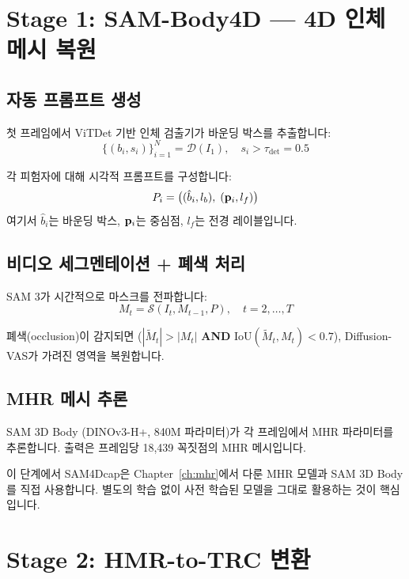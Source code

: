 \documentclass[11pt, a4paper]{report}
\begin{document}
\section{Stage 1: SAM-Body4D --- 4D 인체 메시 복원}

\subsection{자동 프롬프트 생성}

첫 프레임에서 ViTDet 기반 인체 검출기가 바운딩 박스를 추출합니다:
\begin{equation}
\{(b_i, s_i)\}_{i=1}^N = \mathcal{D}(I_1), \quad s_i > \tau_{\text{det}} = 0.5
\end{equation}

각 피험자에 대해 시각적 프롬프트를 구성합니다:
\begin{equation}
P_i = \big((\hat{b}_i, l_b),\; (\mathbf{p}_i, l_f)\big)
\end{equation}
여기서 $\hat{b}_i$는 바운딩 박스, $\mathbf{p}_i$는 중심점, $l_f$는 전경 레이블입니다.

\subsection{비디오 세그멘테이션 + 폐색 처리}

SAM 3가 시간적으로 마스크를 전파합니다:
\begin{equation}
M_t = \mathcal{S}(I_t, M_{t-1}, P), \quad t = 2, \ldots, T
\end{equation}

폐색(occlusion)이 감지되면 ($|\tilde{M}_t| > |M_t|$ \textbf{AND} $\text{IoU}(\tilde{M}_t, M_t) < 0.7$), Diffusion-VAS가 가려진 영역을 복원합니다.

\subsection{MHR 메시 추론}

SAM 3D Body (DINOv3-H+, 840M 파라미터)가 각 프레임에서 MHR 파라미터를 추론합니다. 출력은 프레임당 18,439 꼭짓점의 MHR 메시입니다.

\begin{importantnote}
이 단계에서 SAM4Dcap은 Chapter~\ref{ch:mhr}에서 다룬 MHR 모델과 SAM 3D Body를 직접 사용합니다. 별도의 학습 없이 사전 학습된 모델을 그대로 활용하는 것이 핵심입니다.
\end{importantnote}


\section{Stage 2: HMR-to-TRC 변환}
\end{document}
